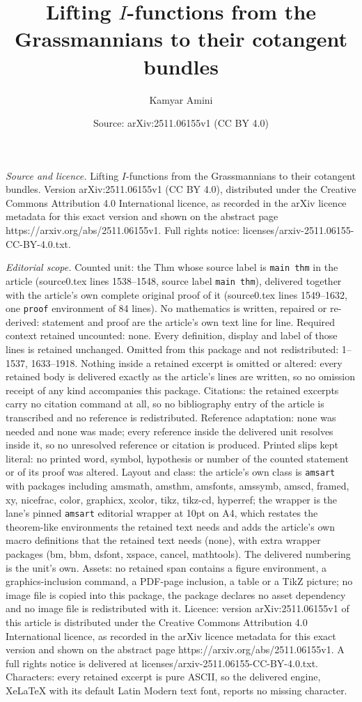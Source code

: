 \documentclass[10pt,a4paper]{amsart}
\title[Lifting $I$-functions from the Grassmannians to their cotang]{Lifting $I$-functions from the Grassmannians to their cotangent bundles}
\author{Kamyar Amini}
\date{Source: arXiv:2511.06155v1 (CC BY 4.0)}
\begin{document}
\maketitle

\noindent\emph{Source and licence.} Lifting $I$-functions from the Grassmannians to their cotangent bundles. Version arXiv:2511.06155v1 (CC BY 4.0), distributed under the Creative Commons Attribution 4.0 International licence, as recorded in the arXiv licence metadata for this exact version and shown on the abstract page https://arxiv.org/abs/2511.06155v1. Full rights notice: licenses/arxiv-2511.06155-CC-BY-4.0.txt.\par\smallskip

\noindent\textit{Editorial scope.} Counted unit: the Thm whose source label is \texttt{main thm} in the article (source0.tex lines 1538--1548, source label \texttt{main thm}), delivered together with the article's own complete original proof of it (source0.tex lines 1549--1632, one \texttt{proof} environment of 84 lines). No mathematics is written, repaired or re-derived: statement and proof are the article's own text line for line. Required context retained uncounted: none. Every definition, display and label of those lines is retained unchanged. Omitted from this package and not redistributed: 1--1537, 1633--1918. Nothing inside a retained excerpt is omitted or altered: every retained body is delivered exactly as the article's lines are written, so no omission receipt of any kind accompanies this package. Citations: the retained excerpts carry no citation command at all, so no bibliography entry of the article is transcribed and no reference is redistributed. Reference adaptation: none was needed and none was made; every reference inside the delivered unit resolves inside it, so no unresolved reference or citation is produced. Printed slips kept literal: no printed word, symbol, hypothesis or number of the counted statement or of its proof was altered. Layout and class: the article's own class is \texttt{amsart} with packages including amsmath, amsthm, amsfonts, amssymb, amscd, framed, xy, nicefrac, color, graphicx, xcolor, tikz, tikz-cd, hyperref; the wrapper is the lane's pinned \texttt{amsart} editorial wrapper at 10pt on A4, which restates the theorem-like environments the retained text needs and adds the article's own macro definitions that the retained text needs (none), with extra wrapper packages (bm, bbm, dsfont, xspace, cancel, mathtools). The delivered numbering is the unit's own. Assets: no retained span contains a figure environment, a graphics-inclusion command, a PDF-page inclusion, a table or a TikZ picture; no image file is copied into this package, the package declares no asset dependency and no image file is redistributed with it. Licence: version arXiv:2511.06155v1 of this article is distributed under the Creative Commons Attribution 4.0 International licence, as recorded in the arXiv licence metadata for this exact version and shown on the abstract page https://arxiv.org/abs/2511.06155v1. A full rights notice is delivered at licenses/arxiv-2511.06155-CC-BY-4.0.txt. Characters: every retained excerpt is pure ASCII, so the delivered engine, XeLaTeX with its default Latin Modern text font, reports no missing character.
\end{document}
